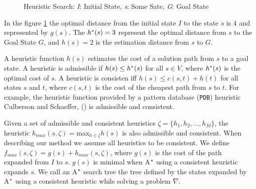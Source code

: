 \begin{figure}[htb]
\centering
{}
\caption{Heuristic Search: \textit{I}: Initial State, \textit{s}: Some Sate, \textit{G}: Goal State} \label{fig:searchSpace}
\end{figure}

In the figure \ref{fig:searchSpace} the optimal distance from the initial state $I$ to  the state $s$ is 4 and represented by $g(s)$. The $h\sp{*}(s) = 3$ represent the optimal distance from $s$ to the Goal State $G$, and $h(s) = 2$ is the estimation distance from $s$ to $G$.

A heuristic function $h(s)$ estimates the cost of a solution path from $s$ to a goal state. A heuristic is admissible if $h(s) \leq h\sp{*}(s)$ for all $s \in V$, where $h\sp{*}(s)$ is the optimal cost of $s$. A heuristic is consisten iff $h(s) \leq c(s,t) + h(t)$ for all states $s$ and $t$, where $c(s,t)$ is the cost of the cheapest path from $s$ to $t$. For example, the heuristic function provided by a pattern database (\texttt{PDB}) heuristic Culberson and Schaeffer, (\citeyear{culberson1998pattern}) is admissible and consistent.

Given a set of admissible and consistent heuristics $\zeta = \{h_{1}, h_{2}, \dots, h_{M}\}$, the heuristic $h_{max}(s,\zeta) = $max$_{h \in \zeta} h(s)$ is also admissible and consistent. When describing our method we assume all heuristics to be consistent. We define $f_{max}(s, \zeta) = g(s) + h_{max}(s, \zeta)$, where $g(s)$ is the cost of the path expanded from $I$ to $s$. $g(s)$ is minimal when A$\sp{*}$ using a consistent heuristic expands $s$. We call an A$\sp{*}$ search tree the tree defined by the states expanded by A$\sp{*}$ using a consistent heuristic while solving a problem $\nabla$.

